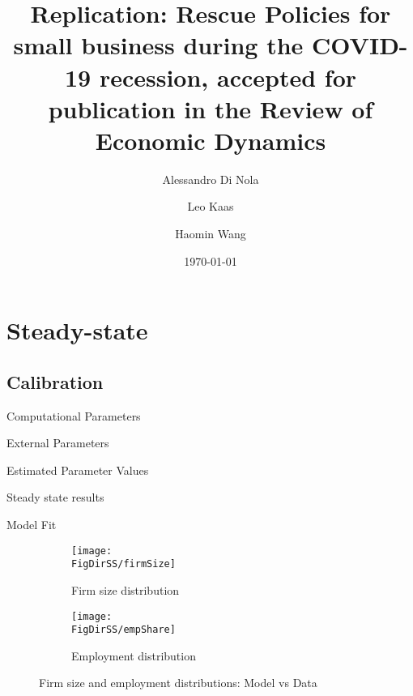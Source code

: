 \documentclass[11pt,english]{article}
\newcommand*{\TabDir}{../tables}
\newcommand*{\FigDirSS}{../figures/ss}
\begin{document}
\title{Replication: Rescue Policies for small business during the COVID-19 recession, accepted for publication in the Review of Economic Dynamics}
\author{Alessandro Di Nola \and Leo Kaas \and Haomin Wang}
\date{\today}
\maketitle

\section{Steady-state}
\subsection{Calibration}
	
\begin{table}[htbp]
	\caption{\label{tab:nerd}Computational Parameters}
	\centering
	
\end{table}

\begin{table}[htbp]
	\caption{\label{tab:calib_external}External Parameters}
	
	\centering{}%
	
\end{table}

\begin{table}[htbp]
	\caption{Estimated Parameter Values}
   	\label{tab:parameters}\centering
   	
\end{table}

\begin{table}[htbp]
	\caption{Steady state results}
	\label{tab:steady_state}\centering
	
\end{table}


\begin{table}[htbp]
	\caption{Model Fit}
    \label{tab:moments}\centering
    
\end{table}


\begin{figure}[htbp]
	\centering
	\begin{subfigure}[b]{0.46\textwidth}
		\centering
		\texttt{[image: \\FigDirSS/firmSize]}
		\caption{Firm size distribution}
	\end{subfigure} \hfill
	\begin{subfigure}[b]{0.46\textwidth}
		\centering
		\texttt{[image: \\FigDirSS/empShare]}
		\caption{Employment distribution}
	\end{subfigure}
	\caption{Firm size and employment distributions: Model vs Data}
	\label{fig:bins}
\end{figure}
    
\end{document}
